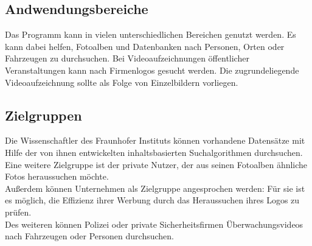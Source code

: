 \subsection{Andwendungsbereiche}

Das Programm kann in vielen unterschiedlichen Bereichen genutzt werden. Es kann dabei helfen, Fotoalben und Datenbanken nach Personen, Orten oder Fahrzeugen zu durchsuchen. Bei Videoaufzeichnungen öffentlicher Veranstaltungen kann nach Firmenlogos gesucht werden. Die zugrundeliegende Videoaufzeichnung sollte als Folge von Einzelbildern vorliegen.

\subsection{Zielgruppen}

Die Wissenschaftler des Fraunhofer Instituts können vorhandene Datensätze mit Hilfe der von ihnen entwickelten inhaltsbasierten Suchalgorithmen durchsuchen.\\
Eine weitere Zielgruppe ist der private Nutzer, der aus seinen Fotoalben ähnliche Fotos heraussuchen möchte.\\
Außerdem können Unternehmen als Zielgruppe angesprochen werden: Für sie ist es möglich, die Effizienz ihrer Werbung durch das Heraussuchen ihres Logos zu prüfen.\\
Des weiteren können Polizei oder private Sicherheitsfirmen Überwachungsvideos nach Fahrzeugen oder Personen durchsuchen.